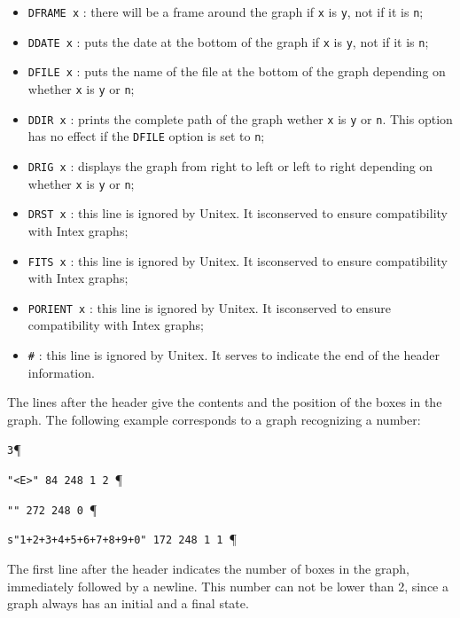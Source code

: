 \begin{itemize}
  \item \verb+DFRAME x+ : there will be a frame around the graph if \verb+x+ is
  \verb+y+, not if it is \verb+n+;

  \item \verb+DDATE x+ : puts the date at the bottom of the graph if \verb+x+ is
  \verb+y+, not if it is \verb+n+;

  \item \verb+DFILE x+ : puts the name of the file at the bottom of the graph
  depending on whether \verb+x+ is \verb+y+ or \verb+n+;

  \item \verb+DDIR x+ : prints the complete path of the graph wether \verb+x+ is
  \verb+y+ or \verb+n+. This option has no effect if the \verb+DFILE+ option is
  set to \verb+n+;

  \item \verb+DRIG x+ : displays the graph from right to left or left to right
  depending on whether \verb+x+ is \verb+y+ or \verb+n+;

  \item \verb+DRST x+ : this line is ignored by Unitex. It isconserved to ensure
  compatibility with Intex graphs;

  \item \verb+FITS x+ : this line is ignored by Unitex. It isconserved to ensure
  compatibility with Intex graphs;

  \item \verb+PORIENT x+ : this line is ignored by Unitex. It isconserved to
  ensure compatibility with Intex graphs;

  \item \verb+#+ : this line is ignored by Unitex. It serves to indicate the end
  of the header information.
\end{itemize}

\bigskip
\noindent The lines after the header give the contents and the position of the
boxes in the graph. The following example corresponds to a graph recognizing a
number:

\bigskip
\verb+3+\P

\verb+"<E>" 84 248 1 2 +\P

\verb+"" 272 248 0 +\P

\verb$s"1+2+3+4+5+6+7+8+9+0" 172 248 1 1 $\P

\bigskip
\noindent The first line after the header indicates the number of boxes in the
graph, immediately followed by a newline. This number can not be lower than 2,
since a graph always has an initial and a final state.

